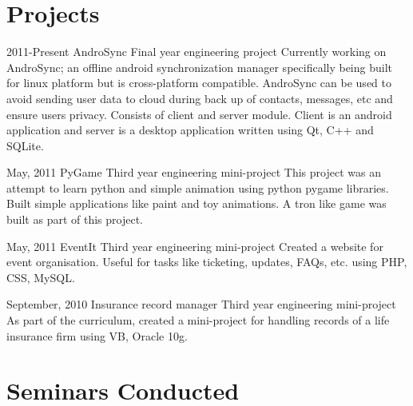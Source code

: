 \documentclass[11pt,a4paper]{moderncv}
\begin{document}

\section{Projects}
\cventry
{2011-Present}
{AndroSync}
{Final year engineering project}
{}
{}
{Currently working on AndroSync; an offline android synchronization manager specifically being built for linux platform but is cross-platform 
compatible. AndroSync can be used to avoid sending user data to cloud during back up of contacts, messages, etc and ensure users privacy. 
Consists of client and server module. Client is an android application and server is a desktop application written using Qt, C++ and SQLite.}


\cventry
{May, 2011}
{PyGame}
{Third year engineering mini-project}
{}
{}
{This project was an attempt to learn python and simple animation using python pygame libraries. Built simple applications like paint and toy 
animations. A tron like game was built as part of this project. }

\cventry
{May, 2011}
{EventIt}
{Third year engineering mini-project}
{}
{}
{Created a website for event organisation. Useful for tasks like ticketing, updates, FAQs, etc. using PHP, CSS, MySQL. }

\cventry
{September, 2010}
{Insurance record manager}
{Third year engineering mini-project}
{}
{}
{As part of the curriculum, created a mini-project for handling records of a life insurance firm using VB, Oracle 10g. }


\section{Seminars Conducted}



\end{document}
